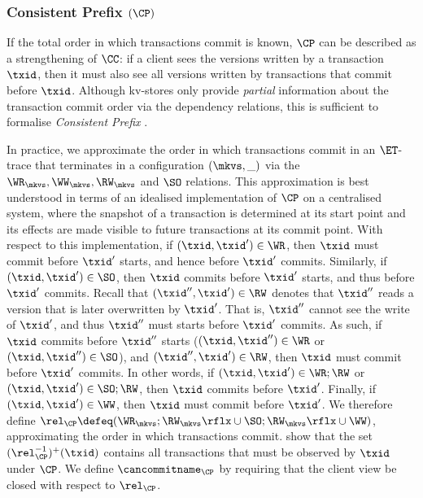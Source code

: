 \subsubsection{Consistent Prefix \((\CP)\)}
\label{para:cp}
If the total order in which transactions commit is known, \(\CP\)
can be described as a strengthening of \(\CC\): 
if a client sees the versions written by a transaction \(\txid\),
then it must also see all versions written by transactions that commit before \(\txid\). 
Although kv-stores only provide {\em partial} information about the transaction commit order via the dependency relations,
this is sufficient to formalise \emph{Consistent Prefix} \cite{laws}.

In practice, we approximate the order in which transactions 
commit in an \(\ET\)-trace that terminates in a configuration \((\mkvs, \_)\) via the \(\WR_{\mkvs}, \WW_{\mkvs}, \RW_{\mkvs}\) and \(\SO\)  relations. 
This approximation is best understood in terms of an idealised implementation of \(\CP\) on a centralised system,
where the snapshot of a transaction is determined at its start point and its effects are made visible to future transactions at its commit point.
With respect to this implementation, if \((\txid,\txid') \in \WR\), then 
\(\txid\) must commit before \(\txid'\) starts, and hence before \(\txid'\) commits.
Similarly, if \((\txid,\txid') \in \SO\), then \(\txid\) commits before \(\txid'\) starts, 
and thus before \(\txid'\) commits.
Recall that \((\txid'', \txid') \in \RW\)
denotes that \(\txid''\) reads a version that is later overwritten by \(\txid'\).
That is, \(\txid''\) cannot see the write of \(\txid'\), and thus \(\txid''\) must starts before 
\(\txid'\) commits. 
As such, if \(\txid\) commits before \(\txid''\) starts 
(\((\txid, \txid'') \in \WR\) or \((\txid,\txid'') \in \SO\)), 
and \((\txid'', \txid') \in \RW\), then \(\txid\) must commit before 
\(\txid'\) commits. 
In other words, if \((\txid,\txid') \in \WR;\RW\) or \((\txid,\txid') \in \SO;\RW\), then \(\txid\) commits before \(\txid'\).
Finally, if \((\txid,\txid') \in\WW\), then \(\txid\) must commit before \(\txid'\). 
We therefore define \(\rel_{\CP} \defeq (\WR_{\mkvs}; \RW_{\mkvs}\rflx \cup \SO;  \RW_{\mkvs}\rflx \cup \WW)\), approximating the order in which transactions commit. 
%
\citet{laws} show that the set \((\rel_{\CP}^{-1})^{+}(\txid)\) contains all transactions that must be observed by \(\txid\) under \(\CP\). 
We define \(\cancommitname_{\CP}\) by requiring that the client view be 
closed with respect to \(\rel_{\CP}\).

